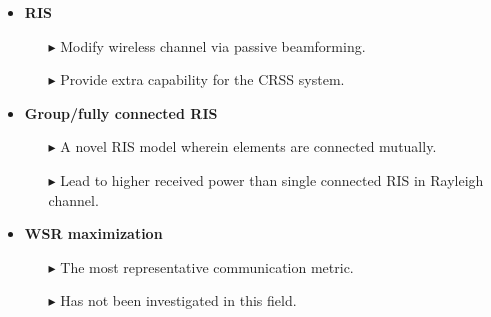 \documentclass[paperwidth=841mm,paperheight=1300mm,portrait]{baposter}
\begin{document}
\begin{poster}
{\begin{itemize}[leftmargin=1.4em]
        \vspace{-5pt}
        \item \textbf{RIS}
        \vspace{-4pt}
        \begin{itemize}[leftmargin=1em]
        \vspace{-2pt}\item[$\blacktriangleright$]  Modify wireless channel via passive beamforming.
        \vspace{-2pt}\item[$\blacktriangleright$]  Provide extra capability for the CRSS system.
        \end{itemize}

        \vspace{-5pt}
        \item \textbf{Group/fully connected RIS}
        \vspace{-4pt}
        \begin{itemize}[leftmargin=1em]
        \vspace{-2pt}\item[$\blacktriangleright$]  A novel RIS model wherein elements are connected mutually.
        \vspace{-2pt}\item[$\blacktriangleright$]  Lead to higher received power than single connected RIS in Rayleigh channel.
        \end{itemize}

        \item \textbf{WSR maximization}
        \vspace{-4pt}
        \begin{itemize}[leftmargin=1em]
        \vspace{-2pt}\item[$\blacktriangleright$]  The most representative communication metric.
        \item[$\blacktriangleright$]  Has not been investigated in this field.
        \end{itemize}
    \end{itemize}

}


\end{poster}
\end{document}
